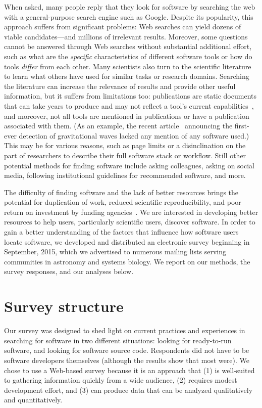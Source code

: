 \documentclass{casicswhitepaper}
\begin{document}
When asked, many people reply that they look for software by searching the web with a general-purpose search engine such as Google.  Despite its popularity, this approach suffers from significant problems: Web searches can yield dozens of viable candidates---and millions of irrelevant results.  Moreover, some questions cannot be answered through Web searches without substantial additional effort, such as what are the \emph{specific} characteristics of different software tools or how do tools \emph{differ} from each other.  Many scientists also turn to the scientific literature to learn what others have used for similar tasks or research domains.  Searching the literature can increase the relevance of results and provide other useful information, but it suffers from limitations too: publications are static documents that can take years to produce and may not reflect a tool's current capabilities~\cite{wren_2004}, and moreover, not all tools are mentioned in publications or have a publication associated with them.  (As an example, the recent article~\cite{abbott2016observation} announcing the first-ever detection of gravitational waves lacked any mention of any software used.)  This may be for various reasons, such as page limits or a disinclination on the part of researchers to describe their full software stack or workflow.  Still other potential methods for finding software include asking colleagues, asking on social media, following institutional guidelines for recommended software, and more.

The difficulty of finding software and the lack of better resources brings the potential for duplication of work, reduced scientific reproducibility, and poor return on investment by funding agencies~\citep{cannata_2005}.  We are interested in developing better resources to help users, particularly scientific users, discover software.  In order to gain a better understanding of the factors that influence how software users locate software, we developed and distributed an electronic survey beginning in September, 2015, which we advertised to numerous mailing lists serving communities in astronomy and systems biology.  We report on our methods, the survey responses, and our analyses below.


\section{Survey structure}

Our survey was designed to shed light on current practices and experiences in searching for software in two different situations: looking for ready-to-run software, and looking for software source code.  Respondents did not have to be software developers themselves (although the results show that most were).  We chose to use a Web-based survey because it is an approach that (1) is well-suited to gathering information quickly from a wide audience, (2) requires modest development effort, and (3) can produce data that can be analyzed qualitatively and quantitatively.
\end{document}
